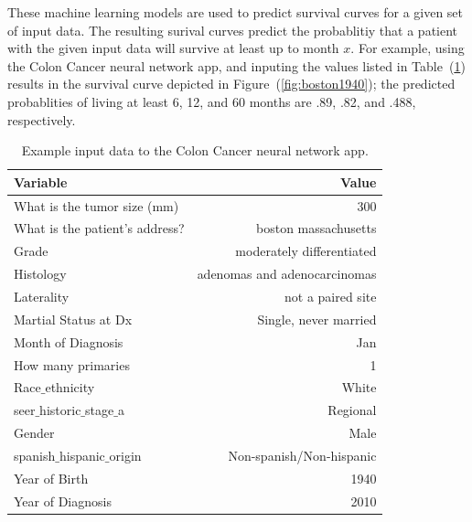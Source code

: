 \documentclass[a4paper,11pt]{article}
\begin{document}
These machine learning models are used to predict survival curves for a given set of input data. 
The resulting surival curves predict the probablitiy that a patient with the given input data will survive at least up to month $x$. For example, using the Colon Cancer neural network app, and 
inputing the values listed in Table~(\ref{tab:boston1940}) results in the survival curve depicted in Figure~(\ref{fig:boston1940}); the predicted probablities of living 
at least 6, 12, and 60 months are .89, .82, and .488, respectively.


\begin{table}[tbp]
\begin{center}
\begin{tabular}{lr}
\toprule
  Variable  & Value \\ 
\midrule
  What is the tumor size (mm) & 300 \\  
  What is the patient's address? & boston massachusetts \\ 
  Grade & moderately differentiated \\  
  Histology & adenomas and adenocarcinomas \\ 
  Laterality & not a paired site \\  
 Martial Status at Dx & Single, never married \\  
 Month of Diagnosis & Jan \\  
 How many primaries & 1 \\  
  Race$\_$ethnicity & White \\  
  seer$\_$historic$\_$stage$\_$a  & Regional \\ 
  Gender & Male \\  
  spanish$\_$hispanic$\_$origin & Non-spanish/Non-hispanic \\ 
 Year of Birth & 1940 \\  
  Year of Diagnosis & 2010 \\
\bottomrule
\end{tabular}
\caption{Example input data to the Colon Cancer neural network app.}
\label{tab:boston1940}
\end{center}
\end{table}
\end{document}
